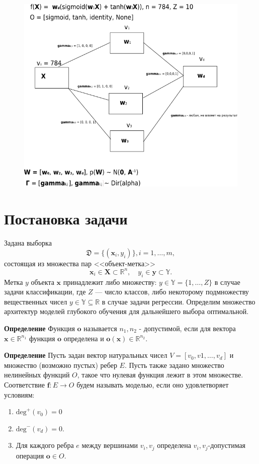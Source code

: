 \documentclass[12pt]{article}
\begin{document}
\clearpage
\begin{figure}[TBPH!]
\includegraphics[width=\textwidth]{model_search.png}
\end{figure}
 

\clearpage
\section{Постановка задачи}
Задана выборка  \begin{equation}\label{eq:dataset}\mathfrak{D} = \{(\mathbf{x}_i,y_i)\}, i = 1,\dots,m,\end{equation} состоящая из множества пар <<объект-метка>> $$\mathbf{x}_i \in \mathbf{X} \subset \mathbb{R}^n, \quad {y}_i \in \mathbf{y} \subset \mathbb{Y}.$$ Метка ${y}$  объекта $\mathbf{x}$ принадлежит либо множеству: ${y} \in \mathbb{Y} = \{1, \dots, Z\}$ в случае задачи классификации, где $Z$ --- число классов, либо некоторому подмножеству вещественных чисел ${y} \in \mathbb{Y}  \subseteq \mathbb{R}$ в случае задачи регрессии. Определим множество архитектур моделей глубокого обучения для дальнейшего выбора оптимальной. 

\textbf{Определение} Функция $\mathbf{o}$ называется $n_1,n_2$ - допустимой, если для вектора $\mathbf{x} \in \mathbb{R}^{n_1}$ функция $\mathbf{o}$ определена и $\mathbf{o}(\mathbf{x}) \in \mathbb{R}^{n_2}$.


\textbf{Определение} Пусть задан вектор натуральных чисел  $V = [v_0, v1,\dots,v_d]$ и множество (возможно пустых) ребер $E$.
Пусть также задано множество нелинейных функций ${O}$, такое что нулевая функция лежит в этом множестве.
Соответствие $\mathbf{f}: E \to O$ будем называть моделью, если оно удовлетворяет условиям:
\begin{enumerate}
\item $\text{deg}^{+}({v}_0) = 0$
\item $\text{deg}^{-}({v}_d) = 0$.
\item Для каждого ребра $e$ между вершинами $v_i,v_j$ определена $v_i, v_j$-допустимая операция $\mathbf{o} \in O$.  
\end{enumerate}
\end{document}
